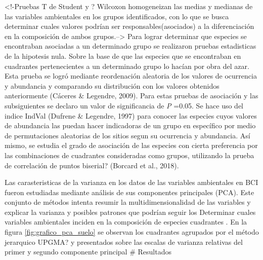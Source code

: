\documentclass[11pt,]{article}
\begin{document}
\textless{}!-Pruebas T de Student y ? Wilcoxon homogeneizan las medias y
medianas de las variables ambientales en los grupos identificados, con
lo que se busca determinar cuales valores podrían ser
responsables(asociados) a la diferenciación en la composición de ambos
grupos.--\textgreater{} Para lograr determinar que especies se
encontraban asociadas a un determinado grupo se realizaron pruebas
estadisticas de la hipotesis nula. Sobre la base de que las especies que
se encontraban en cuadrantes pertenecientes a un determinado grupo lo
hacían por obra del azar. Esta prueba se logró mediante reordenación
aleatoria de los valores de ocurrencia y abundancia y comparando su
distribución con los valores obtenidos anteriormente (Cáceres \&
Legendre, 2009). Para estas pruebas de asociación y las subsiguientes se
declaro un valor de significancia de \emph{P} =0.05. Se hace uso del
indice IndVal (Dufrene \& Legendre, 1997) para conocer las especies
cuyos valores de abundancia las puedan hacer indicadoras de un grupo en
específico por medio de permutaciones aleatorias de los sitios segun su
ocurrencia y abundancia. Así mismo, se estudia el grado de asociación de
las especies con cierta preferencia por las combinaciones de cuadrantes
consideradas como grupos, utilizando la prueba de correlación de puntos
biserial? (Borcard et al., 2018).

Las carasteristicas de la varianza en los datos de las variables
ambientales en BCI fueron estudiadas mediante análisis de sus
componentes principales (PCA). Este conjunto de métodos intenta resumir
la multidimensionalidad de las variables y explicar la varianza y
posibles patrones que podrían seguir los Determinar cuales variables
ambientales inciden en la composición de especies cuadrantes . En la
figura \ref{fig:grafico_pca_suelo} se observan los cuadrantes agrupados
por el método jerarquico UPGMA? y presentados sobre las escalas de
varianza relativas del primer y segundo componente principal \#
Resultados
\end{document}
